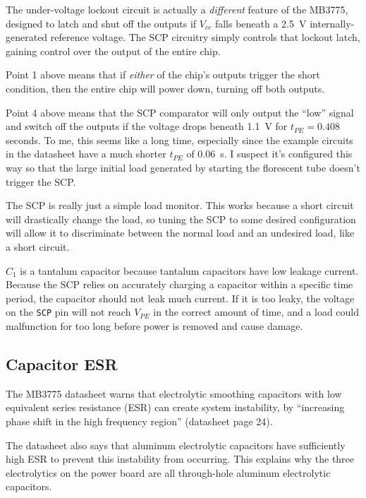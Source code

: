 \documentclass{article}
\newcommand{\Vcc}{$V_{cc}$}
\newcommand{\chippin}{\texttt}
\newcommand{\model}{\textsf}
\begin{document}
The under-voltage lockout circuit is actually a \emph{different}
feature of the \model{MB3775}, designed to latch and shut off the
outputs if \Vcc{} falls beneath a \qty{2.5}{\volt}
internally-generated reference voltage. The SCP circuitry simply
controls that lockout latch, gaining control over the output of the
entire chip.

Point 1 above means that if \emph{either} of the chip's outputs
trigger the short condition, then the entire chip will power down,
turning off both outputs.

Point 4 above means that the SCP comparator will only output the
``low'' signal and switch off the outputs if the voltage drops beneath
\qty{1.1}{\volt} for $t_{PE} = 0.408$ seconds. To me, this seems like
a long time, especially since the example circuits in the datasheet
have a much shorter $t_{PE}$ of \qty{0.06}{\second}. I suspect it's
configured this way so that the large initial load generated by
starting the florescent tube doesn't trigger the SCP.

The SCP is really just a simple load monitor. This works because a
short circuit will drastically change the load, so tuning the SCP to
some desired configuration will allow it to discriminate between the
normal load and an undesired load, like a short circuit.

$C_1$ is a tantalum capacitor because tantalum capacitors have low
leakage current. Because the SCP relies on accurately charging a
capacitor within a specific time period, the capacitor should not leak
much current. If it is too leaky, the voltage on the \chippin{SCP} pin
will not reach $V_{PE}$ in the correct amount of time, and a load could
malfunction for too long before power is removed and cause damage.

\subsection{Capacitor ESR}
The \model{MB3775} datasheet warns that electrolytic smoothing
capacitors with low equivalent series resistance (ESR) can create
system instability, by ``increasing phase shift in the high frequency
region'' (datasheet page 24).

The datasheet also says that aluminum electrolytic capacitors have
sufficiently high ESR to prevent this instability from occurring. This
explains why the three electrolytics on the power board are all
through-hole aluminum electrolytic capacitors.
\end{document}
